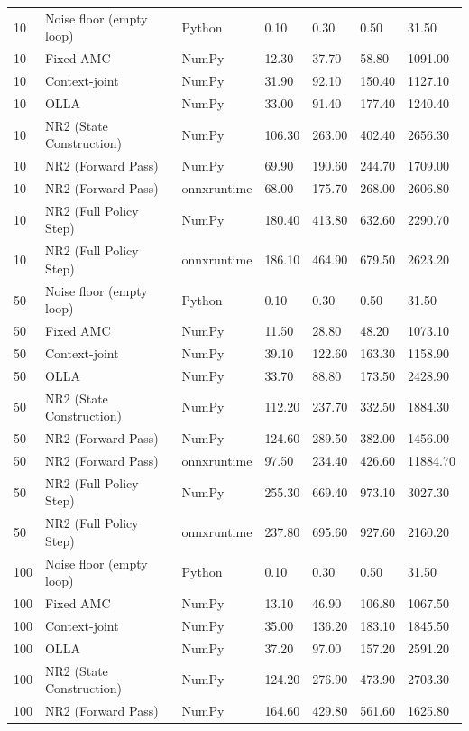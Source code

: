 \documentclass[10pt]{article}
\begin{document}
\begin{landscape}
\begin{longtable}{@{}lllllll@{}}
\midrule
\endhead
10 & Noise floor (empty loop) & Python & 0.10 & 0.30 & 0.50 & 31.50 \\
10 & Fixed AMC & NumPy & 12.30 & 37.70 & 58.80 & 1091.00 \\
10 & Context-joint & NumPy & 31.90 & 92.10 & 150.40 & 1127.10 \\
10 & OLLA & NumPy & 33.00 & 91.40 & 177.40 & 1240.40 \\
10 & NR2 (State Construction) & NumPy & 106.30 & 263.00 & 402.40 & 2656.30 \\
10 & NR2 (Forward Pass) & NumPy & 69.90 & 190.60 & 244.70 & 1709.00 \\
10 & NR2 (Forward Pass) & onnxruntime & 68.00 & 175.70 & 268.00 & 2606.80 \\
10 & NR2 (Full Policy Step) & NumPy & 180.40 & 413.80 & 632.60 & 2290.70 \\
10 & NR2 (Full Policy Step) & onnxruntime & 186.10 & 464.90 & 679.50 & 2623.20 \\
50 & Noise floor (empty loop) & Python & 0.10 & 0.30 & 0.50 & 31.50 \\
50 & Fixed AMC & NumPy & 11.50 & 28.80 & 48.20 & 1073.10 \\
50 & Context-joint & NumPy & 39.10 & 122.60 & 163.30 & 1158.90 \\
50 & OLLA & NumPy & 33.70 & 88.80 & 173.50 & 2428.90 \\
50 & NR2 (State Construction) & NumPy & 112.20 & 237.70 & 332.50 & 1884.30 \\
50 & NR2 (Forward Pass) & NumPy & 124.60 & 289.50 & 382.00 & 1456.00 \\
50 & NR2 (Forward Pass) & onnxruntime & 97.50 & 234.40 & 426.60 & 11884.70 \\
50 & NR2 (Full Policy Step) & NumPy & 255.30 & 669.40 & 973.10 & 3027.30 \\
50 & NR2 (Full Policy Step) & onnxruntime & 237.80 & 695.60 & 927.60 & 2160.20 \\
100 & Noise floor (empty loop) & Python & 0.10 & 0.30 & 0.50 & 31.50 \\
100 & Fixed AMC & NumPy & 13.10 & 46.90 & 106.80 & 1067.50 \\
100 & Context-joint & NumPy & 35.00 & 136.20 & 183.10 & 1845.50 \\
100 & OLLA & NumPy & 37.20 & 97.00 & 157.20 & 2591.20 \\
100 & NR2 (State Construction) & NumPy & 124.20 & 276.90 & 473.90 & 2703.30 \\
100 & NR2 (Forward Pass) & NumPy & 164.60 & 429.80 & 561.60 & 1625.80 \\

\end{longtable}
\end{landscape}
\end{document}
